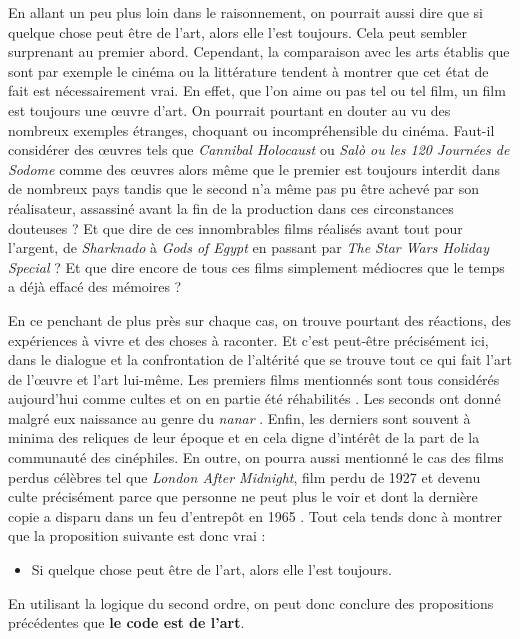 \documentclass[12pt]{article} %
\begin{document}
En allant un peu plus loin dans le raisonnement, on pourrait aussi dire que si quelque chose peut être de l'art, alors elle l'est toujours. Cela peut sembler surprenant au premier abord. Cependant, la comparaison avec les arts établis que sont par exemple le cinéma ou la littérature tendent à montrer que cet état de fait est nécessairement vrai. En effet, que l'on aime ou pas tel ou tel film, un film est toujours une œuvre d'art. On pourrait pourtant en douter au vu des nombreux exemples étranges, choquant ou incompréhensible du cinéma. Faut-il considérer des œuvres tels que \textit{Cannibal Holocaust} ou \textit{Salò ou les 120 Journées de Sodome} comme des œuvres alors même que le premier est toujours interdit dans de nombreux pays tandis que le second n'a même pas pu être achevé par son réalisateur, assassiné avant la fin de la production dans ces circonstances douteuses ? Et que dire de ces innombrables films réalisés avant tout pour l'argent, de \textit{Sharknado} à \textit{Gods of Egypt} en passant par \textit{The Star Wars Holiday Special} ? Et que dire encore de tous ces films simplement médiocres que le temps a déjà effacé des mémoires ? 

En ce penchant de plus près sur chaque cas, on trouve pourtant des réactions, des expériences à vivre et des choses à raconter. Et c'est peut-être précisément ici, dans le dialogue et la confrontation de l'altérité que se trouve tout ce qui fait l'art de l'œuvre et l'art lui-même. Les premiers films mentionnés sont tous considérés aujourd'hui comme cultes et on en partie été réhabilités \cite{noauthor_undated-bk} \cite{Little_White_Lies_magazine_undated-bt}. Les seconds ont donné malgré eux naissance au genre du \textit{nanar} \cite{FTheurel-GodsOfEgypt}. Enfin, les derniers sont souvent à minima des reliques de leur époque et en cela digne d'intérêt de la part de la communauté des cinéphiles. En outre, on pourra aussi mentionné le cas des films perdus célèbres tel que \textit{London After Midnight}, film perdu de 1927 et devenu culte précisément parce que personne ne peut plus le voir et dont la dernière copie a disparu dans un feu d'entrepôt en 1965 \cite{Cowie2022-xt}. Tout cela tends donc à montrer que la proposition suivante est donc vrai :
\begin{itemize}
    \item Si quelque chose peut être de l'art, alors elle l'est toujours.
\end{itemize}
En utilisant la logique du second ordre, on peut donc conclure des propositions précédentes que \textbf{le code est de l'art}. 
\end{document}
